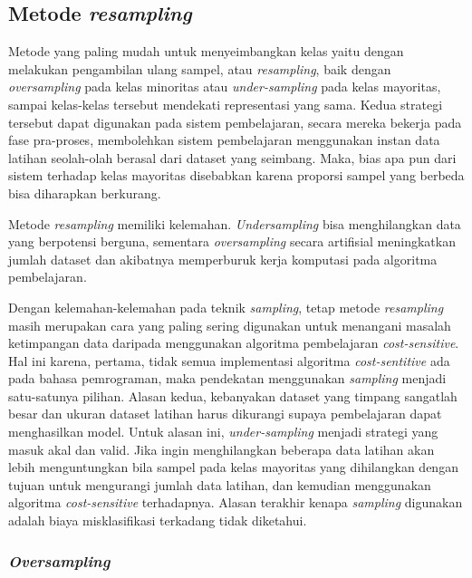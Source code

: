 \documentclass[12pt,a4paper,titlepage]{article}
\begin{document}
\subsection{Metode \textit{resampling}}\label{subsec:metode-resampling}

Metode yang paling mudah untuk menyeimbangkan kelas yaitu dengan melakukan pengambilan ulang sampel, atau \textit{resampling}, baik dengan \textit{oversampling} pada kelas minoritas atau \textit{under-sampling} pada kelas mayoritas, sampai kelas-kelas tersebut mendekati representasi yang sama.
Kedua strategi tersebut dapat digunakan pada sistem pembelajaran, secara mereka bekerja pada fase pra-proses, membolehkan sistem pembelajaran menggunakan instan data latihan seolah-olah berasal dari dataset yang seimbang.
Maka, bias apa pun dari sistem terhadap kelas mayoritas disebabkan karena proporsi sampel yang berbeda bisa diharapkan berkurang.

Metode \textit{resampling} memiliki kelemahan.
\textit{Undersampling} bisa menghilangkan data yang berpotensi berguna, sementara \textit{oversampling} secara artifisial meningkatkan jumlah dataset dan akibatnya memperburuk kerja komputasi pada algoritma pembelajaran.

Dengan kelemahan-kelemahan pada teknik \textit{sampling}, tetap metode \textit{resampling} masih merupakan cara yang paling sering digunakan untuk menangani masalah ketimpangan data daripada menggunakan algoritma pembelajaran \textit{cost-sensitive}.
Hal ini karena, pertama, tidak semua implementasi algoritma \textit{cost-sentitive} ada pada bahasa pemrograman, maka pendekatan menggunakan \textit{sampling} menjadi satu-satunya pilihan.
Alasan kedua, kebanyakan dataset yang timpang sangatlah besar dan ukuran dataset latihan harus dikurangi supaya pembelajaran dapat menghasilkan model.
Untuk alasan ini, \textit{under-sampling} menjadi strategi yang masuk akal dan valid.
Jika ingin menghilangkan beberapa data latihan akan lebih menguntungkan bila sampel pada kelas mayoritas yang dihilangkan dengan tujuan untuk mengurangi jumlah data latihan, dan kemudian menggunakan algoritma \textit{cost-sensitive} terhadapnya.
Alasan terakhir kenapa \textit{sampling} digunakan adalah biaya misklasifikasi terkadang tidak diketahui.

\subsubsection{\textit{Oversampling}}\label{subsubsec:oversampling}
\end{document}
